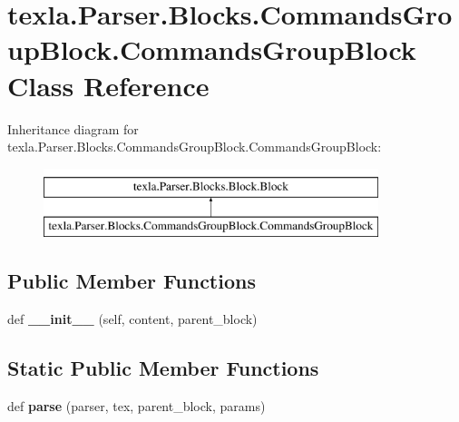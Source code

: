 \hypertarget{classtexla_1_1Parser_1_1Blocks_1_1CommandsGroupBlock_1_1CommandsGroupBlock}{}\section{texla.\+Parser.\+Blocks.\+Commands\+Group\+Block.\+Commands\+Group\+Block Class Reference}
\label{classtexla_1_1Parser_1_1Blocks_1_1CommandsGroupBlock_1_1CommandsGroupBlock}
Inheritance diagram for texla.\+Parser.\+Blocks.\+Commands\+Group\+Block.\+Commands\+Group\+Block\+:\begin{figure}[H]
\begin{center}
\leavevmode
\includegraphics[height=2.000000cm]{classtexla_1_1Parser_1_1Blocks_1_1CommandsGroupBlock_1_1CommandsGroupBlock}
\end{center}
\end{figure}
\subsection*{Public Member Functions}
\begin{DoxyCompactItemize}
\item 
\hypertarget{classtexla_1_1Parser_1_1Blocks_1_1CommandsGroupBlock_1_1CommandsGroupBlock_ac7053bdfedcb59b925296b9b35f22792}{}\label{classtexla_1_1Parser_1_1Blocks_1_1CommandsGroupBlock_1_1CommandsGroupBlock_ac7053bdfedcb59b925296b9b35f22792} 
def {\bfseries \+\_\+\+\_\+init\+\_\+\+\_\+} (self, content, parent\+\_\+block)
\end{DoxyCompactItemize}
\subsection*{Static Public Member Functions}
\begin{DoxyCompactItemize}
\item 
\hypertarget{classtexla_1_1Parser_1_1Blocks_1_1CommandsGroupBlock_1_1CommandsGroupBlock_ac363b42da3c96959006dcc9d9ad9f885}{}\label{classtexla_1_1Parser_1_1Blocks_1_1CommandsGroupBlock_1_1CommandsGroupBlock_ac363b42da3c96959006dcc9d9ad9f885} 
def {\bfseries parse} (parser, tex, parent\+\_\+block, params)
\end{DoxyCompactItemize}
